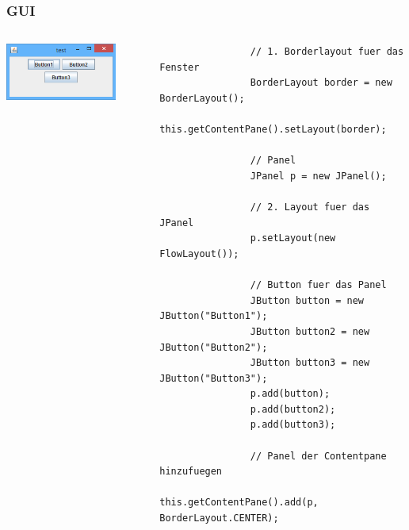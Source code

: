 \begin{frame}[fragile]
	\frametitle{GUI}
	\begin{columns}
		\begin{column}{0.5\textwidth}
			\small
			\center
			\includegraphics[width=0.8\textwidth,
			keepaspectratio=true]{bilder/layouts.png}
		\end{column}
		\begin{column}{0.5\textwidth}
			\begin{lstlisting}
				// 1. Borderlayout fuer das Fenster
				BorderLayout border = new BorderLayout();
				this.getContentPane().setLayout(border);
				
				// Panel
				JPanel p = new JPanel();
				
				// 2. Layout fuer das JPanel
				p.setLayout(new FlowLayout());
				
				// Button fuer das Panel
				JButton button = new JButton("Button1");
				JButton button2 = new JButton("Button2");
				JButton button3 = new JButton("Button3");
				p.add(button); 
				p.add(button2);
				p.add(button3);
				
				// Panel der Contentpane hinzufuegen
				this.getContentPane().add(p, BorderLayout.CENTER);
			\end{lstlisting}
		\end{column}
	\end{columns}
\end{frame}